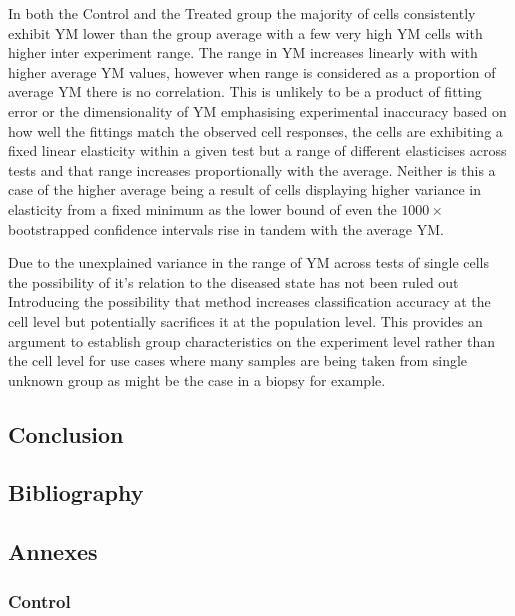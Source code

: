 \documentclass[
  paper=a4,
  ,captions=tableheading
]{scrartcl}
\makeatletter
\newcommand*\pandocbounded[1]{%
  \sbox\pandoc@box{#1}%
  \Gscale@div\@tempa{\textheight}{\dimexpr\ht\pandoc@box+\dp\pandoc@box\relax}%
  \Gscale@div\@tempb{\linewidth}{\wd\pandoc@box}%
  \ifdim\@tempb\p@<\@tempa\p@\let\@tempa\@tempb\fi%
  \ifdim\@tempa\p@<\p@\scalebox{\@tempa}{\usebox\pandoc@box}%
  \else\usebox{\pandoc@box}%
  \fi%
}
\makeatother
\begin{document}
In both the Control and the Treated group the majority of cells
consistently exhibit YM lower than the group average with a few very
high YM cells with higher inter experiment range. The range in YM
increases linearly with with higher average YM values, however when
range is considered as a proportion of average YM there is no
correlation. This is unlikely to be a product of fitting error or the
dimensionality of YM emphasising experimental inaccuracy based on how
well the fittings match the observed cell responses, the cells are
exhibiting a fixed linear elasticity within a given test but a range of
different elasticises across tests and that range increases
proportionally with the average. Neither is this a case of the higher
average being a result of cells displaying higher variance in elasticity
from a fixed minimum as the lower bound of even the \(1000\times\)
bootstrapped confidence intervals rise in tandem with the average YM.

\pandocbounded{}

Due to the unexplained variance in the range of YM across tests of
single cells the possibility of it's relation to the diseased state has
not been ruled out Introducing the possibility that method increases
classification accuracy at the cell level but potentially sacrifices it
at the population level. This provides an argument to establish group
characteristics on the experiment level rather than the cell level for
use cases where many samples are being taken from single unknown group
as might be the case in a biopsy for example.

\subsection{Conclusion}\label{conclusion}

\subsection{Bibliography}\label{bibliography}

\subsection{Annexes}\label{annexes}

\subsubsection{Control}\label{control}
\end{document}
